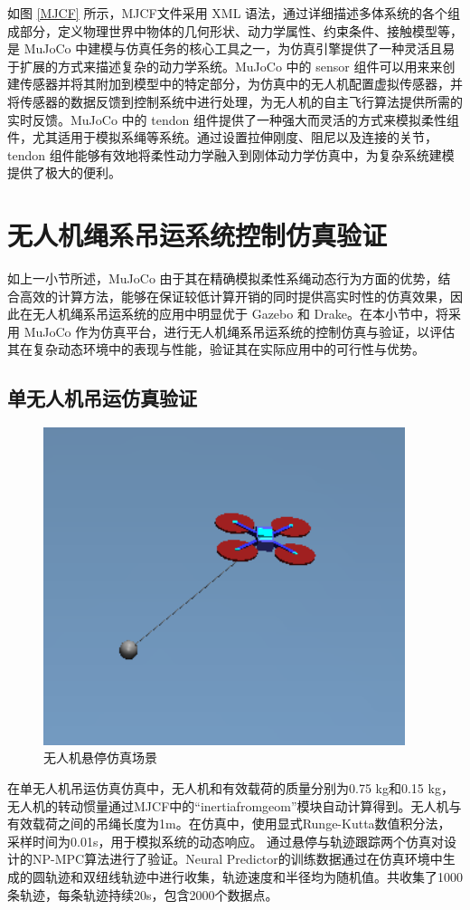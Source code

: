 \documentclass[lang=chs, degree=master, blindreview=true, winfonts=true]{yanputhesis}
\begin{document}
如图 \ref{MJCF} 所示，MJCF文件采用 XML 语法，通过详细描述多体系统的各个组成部分，定义物理世界中物体的几何形状、动力学属性、约束条件、接触模型等，是 MuJoCo 中建模与仿真任务的核心工具之一，为仿真引擎提供了一种灵活且易于扩展的方式来描述复杂的动力学系统。MuJoCo 中的 sensor 组件可以用来来创建传感器并将其附加到模型中的特定部分，为仿真中的无人机配置虚拟传感器，并将传感器的数据反馈到控制系统中进行处理，为无人机的自主飞行算法提供所需的实时反馈。MuJoCo 中的 tendon 组件提供了一种强大而灵活的方式来模拟柔性组件，尤其适用于模拟系绳等系统。通过设置拉伸刚度、阻尼以及连接的关节，tendon 组件能够有效地将柔性动力学融入到刚体动力学仿真中，为复杂系统建模提供了极大的便利。


\section{无人机绳系吊运系统控制仿真验证}
如上一小节所述，MuJoCo 由于其在精确模拟柔性系绳动态行为方面的优势，结合高效的计算方法，能够在保证较低计算开销的同时提供高实时性的仿真效果，因此在无人机绳系吊运系统的应用中明显优于 Gazebo 和 Drake。在本小节中，将采用 MuJoCo 作为仿真平台，进行无人机绳系吊运系统的控制仿真与验证，以评估其在复杂动态环境中的表现与性能，验证其在实际应用中的可行性与优势。

\subsection{单无人机吊运仿真验证}

\begin{figure}[hbt!]
	\centering
	\includegraphics[width=25pc]{picture/kk/xuanting.png} 
	\caption{无人机悬停仿真场景} 
	\label{xuanting}
\end{figure}
在单无人机吊运仿真仿真中，无人机和有效载荷的质量分别为0.75 kg和0.15 kg，无人机的转动惯量通过MJCF中的“inertiafromgeom”模块自动计算得到。无人机与有效载荷之间的吊绳长度为1m。在仿真中，使用显式Runge-Kutta数值积分法，采样时间为0.01s，用于模拟系统的动态响应。
通过悬停与轨迹跟踪两个仿真对设计的NP-MPC算法进行了验证。Neural Predictor的训练数据通过在仿真环境中生成的圆轨迹和双纽线轨迹中进行收集，轨迹速度和半径均为随机值。共收集了1000条轨迹，每条轨迹持续20s，包含2000个数据点。
\end{document}
